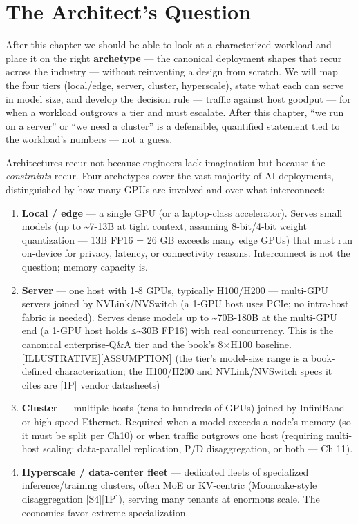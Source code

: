 \section*{The Architect's Question}\label{the-architects-question}

After this chapter we should be able to look at a characterized workload
and place it on the right \textbf{archetype} --- the canonical
deployment shapes that recur across the industry --- without reinventing
a design from scratch. We will map the four tiers (local/edge, server,
cluster, hyperscale), state what each can serve in model size, and
develop the decision rule --- traffic against host goodput --- for when
a workload outgrows a tier and must escalate. After this chapter, ``we
run on a server'' or ``we need a cluster'' is a defensible, quantified
statement tied to the workload's numbers --- not a guess.

\label{concept}


Architectures recur not because engineers lack imagination but because
the \emph{constraints} recur. Four archetypes cover the vast majority of
AI deployments, distinguished by how many GPUs are involved and over
what interconnect:

\begin{enumerate}
\def\labelenumi{\arabic{enumi}.}
\item
  \textbf{Local / edge} --- a single GPU (or a laptop-class
  accelerator). Serves small models (up to \textasciitilde7-13B at tight
  context, assuming 8-bit/4-bit weight quantization --- 13B FP16 = 26 GB
  exceeds many edge GPUs) that must run on-device for privacy, latency,
  or connectivity reasons. Interconnect is not the question; memory
  capacity is.
\item
  \textbf{Server} --- one host with 1-8 GPUs, typically H100/H200 ---
  multi-GPU servers joined by NVLink/NVSwitch (a 1-GPU host uses PCIe;
  no intra-host fabric is needed). Serves dense models up to
  \textasciitilde70B-180B at the multi-GPU end (a 1-GPU host holds
  ≤\textasciitilde30B FP16) with real concurrency. This is the canonical
  enterprise-Q\&A tier and the book's 8×H100 baseline.
  \mbox{{[}ILLUSTRATIVE{]}}\hspace{0pt}\mbox{{[}ASSUMPTION{]}} (the tier's model-size range is a
  book-defined characterization; the H100/H200 and NVLink/NVSwitch specs
  it cites are \mbox{{[}1P{]}} vendor datasheets)
\item
  \textbf{Cluster} --- multiple hosts (tens to hundreds of GPUs) joined
  by InfiniBand or high-speed Ethernet. Required when a model exceeds a
  node's memory (so it must be split per Ch10) or when traffic outgrows
  one host (requiring multi-host scaling: data-parallel replication, P/D
  disaggregation, or both --- Ch 11).
\item
  \textbf{Hyperscale / data-center fleet} --- dedicated fleets of
  specialized inference/training clusters, often MoE or KV-centric
  (Mooncake-style disaggregation \mbox{{[}S4{]}}\hspace{0pt}\mbox{{[}1P{]}}), serving many tenants
  at enormous scale. The economics favor extreme specialization.
\end{enumerate}

